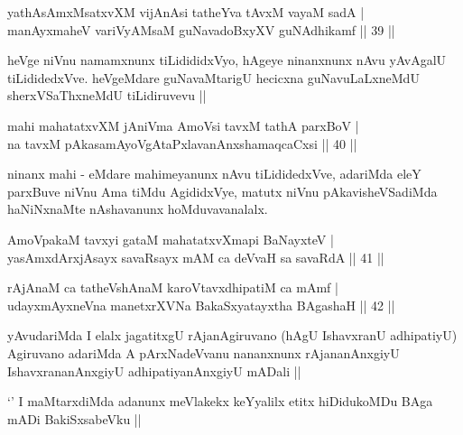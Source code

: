 
\begin{shl}
yathA\s sAmxMsatxvXM vijAnAsi tatheYva tAvxM vayaM sadA | \\
manAyxmaheV variVyAMsaM guNavadoBxyXV guNAdhikamf \hfill|| 39 || 
\end{shl}

\begin{artha}
heVge niVnu namamxnunx tiLidididxVyo, hAgeye ninanxnunx nAvu yAvAgalU tiLididedxVve. heVgeMdare guNavaMtarigU hecicxna guNavuLaLxneMdU sherxVSaThxneMdU tiLidiruvevu ||
\end{artha}


\begin{shl}
mahi mahatatxvXM jAniVma AmoV\s si tavxM tathA parxBoV | \\
na tavxM pAkasamAyoVgAtaPxlavanAnxshamaqcaCxsi \hfill|| 40 || 
\end{shl}

\begin{artha}
ninanx mahi - eMdare mahimeyanunx nAvu tiLididedxVve, adariMda eleY parxBuve niVnu Ama tiMdu AgididxVye, matutx niVnu pAkavisheVSadiMda haNiNxnaMte nAshavanunx hoMduvavanalalx.
\end{artha}

\begin{shl}
AmoV\s pakaM tavxyi gataM mahatatxvXmapi BaNayxteV | \\
yasAmxdArxjA\s sayx savaRsayx mAM ca deVvaH sa savaRdA \hfill|| 41 || 
\end{shl}

\begin{shl}
rAjAnaM ca tatheVshAnaM karoVtavxdhipatiM ca mAmf | \\
udayxmAyxneVna manetxrXVNa BakaSxyatayxtha BAgashaH \hfill|| 42 || 
\end{shl}

\begin{artha}
yAvudariMda I elalx jagatitxgU rAjanAgiruvano (hAgU IshavxranU adhipatiyU) Agiruvano adariMda A pArxNadeVvanu nananxnunx rAjananAnxgiyU IshavxrananAnxgiyU adhipatiyanAnxgiyU mADali ||
\end{artha}

\begin{artha}
`\stext' I maMtarxdiMda adanunx meVlakekx keYyalilx etitx hiDidukoMDu BAga mADi BakiSxsabeVku ||
\end{artha}

